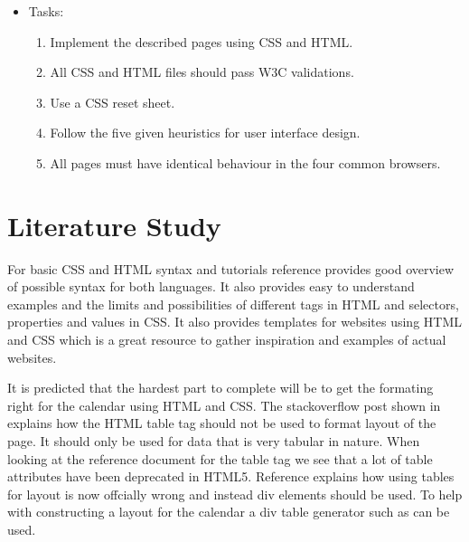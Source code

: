 \documentclass[a4paper]{scrartcl}
\begin{document}
\begin{itemize}
    \item Tasks:
        \begin{enumerate}
            \item Implement the described pages using CSS and HTML.
            \item All CSS and HTML files should pass W3C validations.
            \item Use a CSS reset sheet.
            \item Follow the five given heuristics for user interface design.
            \item All pages must have identical behaviour in the four common browsers.
        \end{enumerate}

\end{itemize}



\section{Literature Study}
For basic CSS and HTML syntax and tutorials reference \citet{noauthor_w3schools_nodate} provides good overview of possible syntax for both languages. It also provides easy to understand examples and the limits and possibilities of different tags in HTML and selectors, properties and values in CSS. It also provides templates for websites using HTML and CSS which is a great resource to gather inspiration and examples of actual websites.

It is predicted that the hardest part to complete will be to get the formating right for the calendar using HTML and CSS. The stackoverflow post shown in \citet{noauthor_html_nodate-1} explains how the HTML table tag should not be used to format layout of the page. It should only be used for data that is very tabular in nature. When looking at the reference document for the table tag \citet{noauthor_html_nodate} we see that a lot of table attributes have been deprecated in HTML5. Reference \citet{noauthor_using_nodate} explains how using tables for layout is now offcially wrong and instead div elements should be used. To help with constructing a layout for the calendar a div table generator such as \citet{noauthor_div_nodate} can be used.
\end{document}
